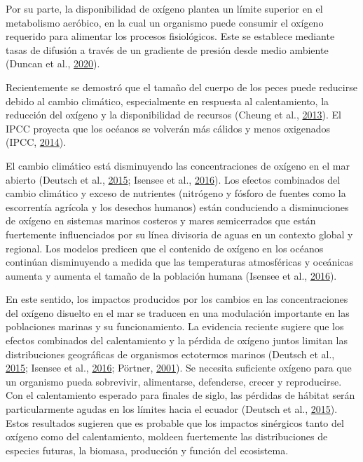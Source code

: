 \documentclass[
]{article}
\begin{document}
Por su parte, la disponibilidad de oxígeno plantea un límite superior en
el metabolismo aeróbico, en la cual un organismo puede consumir el
oxígeno requerido para alimentar los procesos fisiológicos. Este se
establece mediante tasas de difusión a través de un gradiente de presión
desde medio ambiente (Duncan et al.,
\protect\hyperlink{ref-Duncan2020}{2020}).

Recientemente se demostró que el tamaño del cuerpo de los peces puede
reducirse debido al cambio climático, especialmente en respuesta al
calentamiento, la reducción del oxígeno y la disponibilidad de recursos
(Cheung et al., \protect\hyperlink{ref-Cheung2013}{2013}). El IPCC
proyecta que los océanos se volverán más cálidos y menos oxigenados
(IPCC, \protect\hyperlink{ref-IPCC2014}{2014}).

El cambio climático está disminuyendo las concentraciones de oxígeno en
el mar abierto (Deutsch et al.,
\protect\hyperlink{ref-Deutsch2015}{2015}; Isensee et al.,
\protect\hyperlink{ref-Isensee2016}{2016}). Los efectos combinados del
cambio climático y exceso de nutrientes (nitrógeno y fósforo de fuentes
como la escorrentía agrícola y los desechos humanos) están conduciendo a
disminuciones de oxígeno en sistemas marinos costeros y mares
semicerrados que están fuertemente influenciados por su línea divisoria
de aguas en un contexto global y regional. Los modelos predicen que el
contenido de oxígeno en los océanos continúan disminuyendo a medida que
las temperaturas atmosféricas y oceánicas aumenta y aumenta el tamaño de
la población humana (Isensee et al.,
\protect\hyperlink{ref-Isensee2016}{2016}).

En este sentido, los impactos producidos por los cambios en las
concentraciones del oxígeno disuelto en el mar se traducen en una
modulación importante en las poblaciones marinas y su funcionamiento. La
evidencia reciente sugiere que los efectos combinados del calentamiento
y la pérdida de oxígeno juntos limitan las distribuciones geográficas de
organismos ectotermos marinos (Deutsch et al.,
\protect\hyperlink{ref-Deutsch2015}{2015}; Isensee et al.,
\protect\hyperlink{ref-Isensee2016}{2016}; Pörtner,
\protect\hyperlink{ref-Portner2001}{2001}). Se necesita suficiente
oxígeno para que un organismo pueda sobrevivir, alimentarse, defenderse,
crecer y reproducirse. Con el calentamiento esperado para finales de
siglo, las pérdidas de hábitat serán particularmente agudas en los
límites hacia el ecuador (Deutsch et al.,
\protect\hyperlink{ref-Deutsch2015}{2015}). Estos resultados sugieren
que es probable que los impactos sinérgicos tanto del oxígeno como del
calentamiento, moldeen fuertemente las distribuciones de especies
futuras, la biomasa, producción y función del ecosistema.
\end{document}
